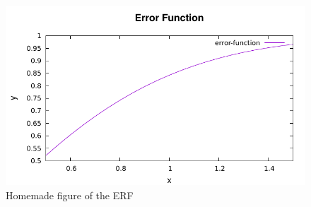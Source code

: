 \documentclass[12pt, a4paper, oneside]{article}
\begin{document}
\begin{figure}
\begin{centering}
\includegraphics[width=\linewidth]{plot.pdf}
\caption{Homemade figure of the ERF}
\label{fig:1}
\end{centering}
\end{figure}
\end{document}
